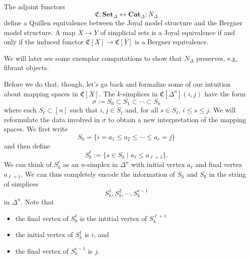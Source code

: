 \begin{theorem}[\cite{???}]
	The adjoint functors  
	\[
	\mathfrak{C} : \mathbf{Set}_{\Delta} \leftrightarrow \mathbf{Cat}_{\Delta} : N_{\Delta}
	\]
	define a Quillen equivalence between the Joyal model structure and the Bergner model structure. A map $X\to Y$ of simplicial sets is a Joyal equivalence if and only if the induced functor $\mathfrak{C}[X]\to \mathfrak{C}[Y]$ is a Bergner equivalence. 
\end{theorem}

We will later see some exemplar computations to show that $N_\Delta$ preserves, e.g, fibrant objects. 

Before we do that, though, let's go back and formalize some of our intuition about mapping spaces in $\mathfrak{C}[X]$. The $k$-simplices in $\mathfrak{C}[\Delta^n](i,j)$ have the form
\[
\sigma:=S_0\subset S_1\subset\cdots \subset S_k
\]
where each $S_\ell\subset [n]$ such that $i,j\in S_\ell$ and, for all $s\in S_\ell$, $i\leq s\leq j$. We will reformulate the data involved in $\sigma$ to obtain a new interpretation of the mapping spaces. We first write 
\[
S_0= \{i=a_1\leq a_2\leq\cdots\leq a_r=j\}
\] 
and then define 
\[
S_k^\ell:=\{s\in S_k \mid a_\ell \leq a_{\ell+1}\}.
\]
We can think of $S_k^\ell$ as an $n$-simplex in $\Delta^n$ with initial vertex $a_\ell$ and final vertex $a_{\ell+1}$. We can thus completely encode the information of $S_0$ and $S_k$ in the string of simplices 
\[
S_k^1, S_k^2, \cdots, S_k^{r-1} 
\] 
in $\Delta^n$. Note that 
\begin{itemize}
	\item the final vertex of $S_k^\ell$ is the intitial vertex of $S_k^{\ell+1}$
	\item the initial vertex of $S_k^1$ is $i$, and 
	\item the final vertex of $S_k^{r-1}$ is $j$.  
\end{itemize}

